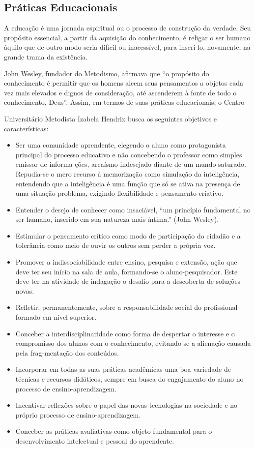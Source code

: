 \documentclass[a4paper, 12pt, openright, oneside, german, french, english, brazil]{abntex2}
\begin{document}
\subsection{Práticas Educacionais}

A educação é uma jornada espiritual ou o processo de construção da verdade. Seu propósito essencial, a partir da aquisição do conhecimento, é religar o ser humano àquilo que de outro modo seria difícil ou inacessível, para inseri-lo, novamente, na grande trama da existência.

John Wesley, fundador do Metodismo, afirmava que “o propósito do conhecimento é permitir que os homens alcem seus pensamentos a objetos cada vez mais elevados e dignos de consideração, até ascenderem à fonte de todo o conhecimento, Deus”. Assim, em termos de suas práticas educacionais, o Centro

Universitário Metodista Izabela Hendrix busca os seguintes objetivos e características:

\begin{itemize}
\item Ser uma comunidade aprendente, elegendo o aluno como protagonista principal do processo educativo e não concebendo o professor como simples emissor de informa-ções, arcaísmo indesejado diante de um mundo saturado. Repudia-se o mero recurso à memorização como simulação da inteligência, entendendo que a inteligência é uma função que só se ativa na presença de uma situação-problema, exigindo flexibilidade e pensamento criativo.
\item Entender o desejo de conhecer como insaciável, ``um princípio fundamental no ser humano, inserido em sua natureza mais íntima.'' (John Wesley). 
\item Estimular o pensamento crítico como modo de participação do cidadão e a tolerância como meio de ouvir os outros sem perder a própria voz.
\item Promover a indissociabilidade entre ensino, pesquisa e extensão, ação que deve ter seu início na sala de aula, formando-se o aluno-pesquisador. Este deve ter na atividade de indagação o desafio para a descoberta de soluções novas.
\item Refletir, permanentemente, sobre a responsabilidade social do profissional formado em nível superior.
\item Conceber a interdisciplinaridade como forma de despertar o interesse e o compromisso dos alunos com o conhecimento, evitando-se a alienação causada pela frag-mentação dos conteúdos.
\item Incorporar em todas as suas práticas acadêmicas uma boa variedade de técnicas e recursos didáticos, sempre em busca do engajamento do aluno no processo de ensino-aprendizagem.
\item Incentivar reflexões sobre o papel das novas tecnologias na sociedade e no próprio processo de ensino-aprendizagem.
\item Conceber as práticas avaliativas como objeto fundamental para o desenvolvimento intelectual e pessoal do aprendente.
\end{itemize}
\end{document}
